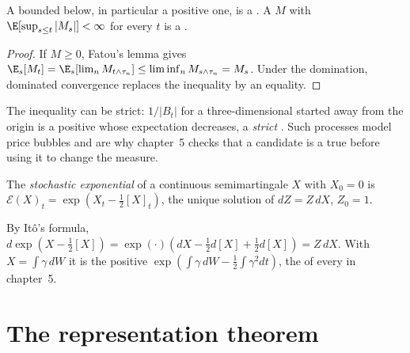 \begin{proposition}\label{prop:qm:ito-calculus:super}
A  bounded below, in particular a positive one, is a . A
 $M$ with $\E[\sup_{s\le t}|M_s|] < \infty$ for every $t$ is a .
\end{proposition}

\begin{proof}
If $M \ge 0$, Fatou's lemma gives $\E_s[M_t] = \E_s[\lim_n M_{t\wedge\tau_n}] \le \liminf_n
M_{s\wedge\tau_n} = M_s$. Under the domination, dominated convergence replaces the inequality by an
equality.
\end{proof}

The inequality can be strict: $1/|B_t|$ for a three-dimensional  started away from
the origin is a positive  whose expectation decreases, a \emph{strict} . Such processes model price bubbles and are why chapter~5 checks that a candidate
 is a true  before using it to change the measure.

\begin{definition}\label{def:qm:ito-calculus:exp}
The \emph{stochastic exponential} of a continuous semimartingale $X$
with $X_0 = 0$ is $\mathcal E(X)_t = \exp(X_t - \tfrac12[X]_t)$, the unique solution of $dZ = Z\,dX$,
$Z_0 = 1$.
\end{definition}

By Itô's formula, $d\exp(X - \tfrac12[X]) = \exp(\cdot)(dX - \tfrac12 d[X] + \tfrac12 d[X]) = Z\,dX$. With
$X = \int\gamma\,dW$ it is the positive  $\exp(\int\gamma\,dW - \tfrac12\int\gamma^2dt)$,
the  of every  in chapter~5.

\section{The representation theorem}

